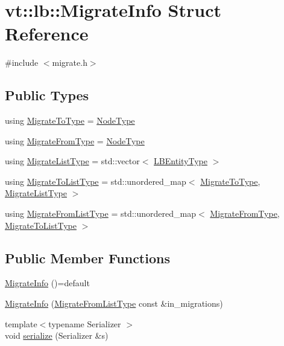 \hypertarget{structvt_1_1lb_1_1_migrate_info}{}\section{vt\+:\+:lb\+:\+:Migrate\+Info Struct Reference}
\label{structvt_1_1lb_1_1_migrate_info}


{\ttfamily \#include $<$migrate.\+h$>$}

\subsection*{Public Types}
\begin{DoxyCompactItemize}
\item 
using \hyperlink{structvt_1_1lb_1_1_migrate_info_a69403740694a22895d616924d243e32b}{Migrate\+To\+Type} = \hyperlink{namespacevt_a866da9d0efc19c0a1ce79e9e492f47e2}{Node\+Type}
\item 
using \hyperlink{structvt_1_1lb_1_1_migrate_info_af2a075cd0219d4ff08758dbb6168d289}{Migrate\+From\+Type} = \hyperlink{namespacevt_a866da9d0efc19c0a1ce79e9e492f47e2}{Node\+Type}
\item 
using \hyperlink{structvt_1_1lb_1_1_migrate_info_ada3a64f80c7036f692d19c3b10bbac16}{Migrate\+List\+Type} = std\+::vector$<$ \hyperlink{namespacevt_a92ec26fb6644cd0ba7eb0ee70c96bee5}{L\+B\+Entity\+Type} $>$
\item 
using \hyperlink{structvt_1_1lb_1_1_migrate_info_a849f608488ac05ab0942c1543933fa4d}{Migrate\+To\+List\+Type} = std\+::unordered\+\_\+map$<$ \hyperlink{structvt_1_1lb_1_1_migrate_info_a69403740694a22895d616924d243e32b}{Migrate\+To\+Type}, \hyperlink{structvt_1_1lb_1_1_migrate_info_ada3a64f80c7036f692d19c3b10bbac16}{Migrate\+List\+Type} $>$
\item 
using \hyperlink{structvt_1_1lb_1_1_migrate_info_ae62aede65465176ae319e0460b6cb5d7}{Migrate\+From\+List\+Type} = std\+::unordered\+\_\+map$<$ \hyperlink{structvt_1_1lb_1_1_migrate_info_af2a075cd0219d4ff08758dbb6168d289}{Migrate\+From\+Type}, \hyperlink{structvt_1_1lb_1_1_migrate_info_a849f608488ac05ab0942c1543933fa4d}{Migrate\+To\+List\+Type} $>$
\end{DoxyCompactItemize}
\subsection*{Public Member Functions}
\begin{DoxyCompactItemize}
\item 
\hyperlink{structvt_1_1lb_1_1_migrate_info_a45759288a2bf31888a832cddbde254c5}{Migrate\+Info} ()=default
\item 
\hyperlink{structvt_1_1lb_1_1_migrate_info_a89b938e58be2fd03a1476df820ac0792}{Migrate\+Info} (\hyperlink{structvt_1_1lb_1_1_migrate_info_ae62aede65465176ae319e0460b6cb5d7}{Migrate\+From\+List\+Type} const \&in\+\_\+migrations)
\item 
{\footnotesize template$<$typename Serializer $>$ }\\void \hyperlink{structvt_1_1lb_1_1_migrate_info_a5fa8164eaee5bb81bf142bff81e99c57}{serialize} (Serializer \&s)
\end{DoxyCompactItemize}
